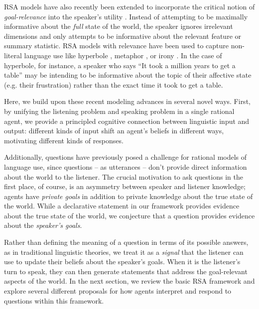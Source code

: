 \documentclass[12pt, floatsintext, jou]{apa6}
\begin{document}
RSA models have also recently been extended to incorporate the critical notion of \emph{goal-relevance} into the speaker's utility \cite{Roberts96_InformationStructureDiscourse, WilsonSperber12_MeaningRelevance}. Instead of attempting to be maximally informative about the \emph{full} state of the world, the speaker ignores irrelevant dimensions and only attempts to be informative about the relevant feature or summary statistic. RSA models with relevance have been used to capture non-literal language use like hyperbole \cite{KaoWuBergenGoodman14_NonliteralNumberWords}, metaphor \cite{KaoEtAl2014-Cogsci}, or irony \cite{KaoGoodman15_IronyCogSci}. In the case of hyperbole, for instance, a speaker who says ``It took a million years to get a table'' may be intending to be informative about the topic of their affective state (e.g. their frustration) rather than the exact time it took to get a table. 

Here, we build upon these recent modeling advances in several novel ways. 
First, by unifying the listening problem and speaking problem in a single rational agent, we provide a principled cognitive connection between linguistic input and output: different kinds of input shift an agent's beliefs in different ways, motivating different kinds of responses. 

Additionally, questions have previously posed a challenge for rational models of language use, since questions -- as utterances -- don't provide direct information about the world to the listener.
The crucial motivation to ask questions in the first place, of course, is an asymmetry between speaker and listener knowledge; agents have \emph{private goals} in addition to private knowledge about the true state of the world. 
While a declarative statement in our framework provides evidence about the true state of the world, we conjecture that a question provides evidence about the \emph{speaker's goals}. 

Rather than defining the meaning of a question in terms of its possible answers, as in traditional linguistic theories, we treat it as a \emph{signal} that the listener can use to update their beliefs about the speaker's goals. 
When it is the listener's turn to speak, they can then generate statements that address the goal-relevant aspects of the world. In the next section, we review the basic RSA framework and explore several different proposals for how agents interpret and respond to questions within this framework.
\end{document}
